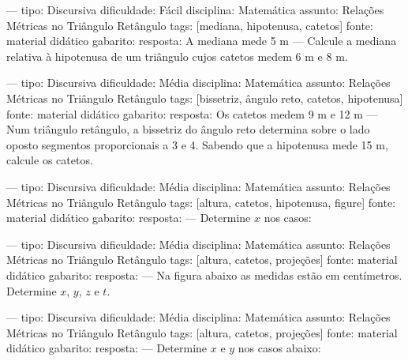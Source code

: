 ---
tipo: Discursiva
dificuldade: Fácil
disciplina: Matemática
assunto: Relações Métricas no Triângulo Retângulo
tags: [mediana, hipotenusa, catetos]
fonte: material didático
gabarito:
resposta: A mediana mede 5 m
---
\question
Calcule a mediana relativa à hipotenusa de um triângulo cujos catetos medem 6 m e 8 m.

---
tipo: Discursiva
dificuldade: Média
disciplina: Matemática
assunto: Relações Métricas no Triângulo Retângulo
tags: [bissetriz, ângulo reto, catetos, hipotenusa]
fonte: material didático
gabarito:
resposta: Os catetos medem 9 m e 12 m
---
\question
Num triângulo retângulo, a bissetriz do ângulo reto determina sobre o lado oposto segmentos proporcionais a 3 e 4. Sabendo que a hipotenusa mede 15 m, calcule os catetos.

---
tipo: Discursiva
dificuldade: Média
disciplina: Matemática
assunto: Relações Métricas no Triângulo Retângulo
tags: [altura, catetos, hipotenusa, figure]
fonte: material didático
gabarito:
resposta:
---
\question
Determine $x$ nos casos:
\begin{parts}
\part
\part
\part
\part
\end{parts}

---
tipo: Discursiva
dificuldade: Média
disciplina: Matemática
assunto: Relações Métricas no Triângulo Retângulo
tags: [altura, catetos, projeções]
fonte: material didático
gabarito:
resposta:
---
\question
Na figura abaixo as medidas estão em centímetros. Determine $x$, $y$, $z$ e $t$.


---
tipo: Discursiva
dificuldade: Média
disciplina: Matemática
assunto: Relações Métricas no Triângulo Retângulo
tags: [altura, catetos, projeções]
fonte: material didático
gabarito:
resposta:
---
\question
Determine $x$ e $y$ nos casos abaixo:
\begin{parts}
\part
\part
\end{parts}

